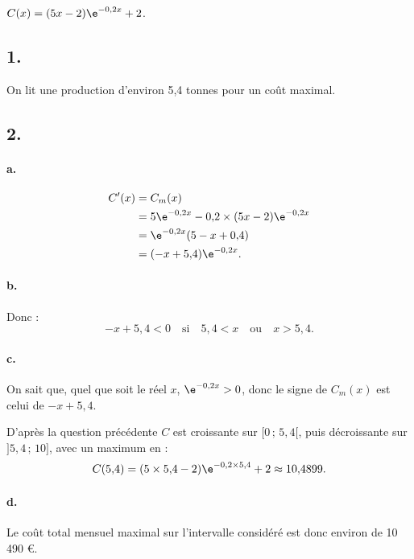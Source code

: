 \( C(x) = (5x - 2)\e^{-0{,}2x} + 2 \).

\subsection*{1.}

On lit une production d'environ 5{,}4 tonnes pour un coût maximal.

\subsection*{2.}

\paragraph{a.}
\begin{align*}
C'(x) &= C_m(x) \\
&= 5\e^{-0{,}2x} - 0{,}2 \times (5x - 2)\e^{-0{,}2x} \\
&= \e^{-0{,}2x}(5 - x + 0{,}4) \\
&= (-x + 5{,}4)\e^{-0{,}2x}.
\end{align*}

\paragraph{b.} Donc :
\[
-x + 5{,}4 < 0 \quad \text{si} \quad 5{,}4 < x \quad \text{ou} \quad x > 5{,}4.
\]

\paragraph{c.}

On sait que, quel que soit le réel \( x \), \( \e^{-0{,}2x} > 0 \), donc le signe de \( C_m(x) \) est celui de \( -x + 5{,}4 \).

D'après la question précédente \( C \) est croissante sur \( [0 \,;\, 5{,}4[ \), puis décroissante sur \( ]5{,}4 \,;\, 10] \), avec un maximum en :
\[
C(5{,}4) = (5 \times 5{,}4 - 2) \e^{-0{,}2 \times 5{,}4} + 2 \approx 10{,}4899.
\]

\begin{center}
\end{center}

\paragraph{d.}

Le coût total mensuel maximal sur l'intervalle considéré est donc environ de 10 490 €.
